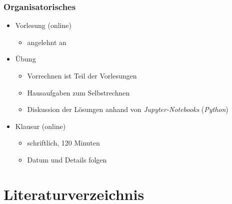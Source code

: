 \documentclass[hyperref={pdfpagemode=FullScreen, colorlinks=false}]{beamer}
\begin{document}
\begin{frame}
\frametitle{Organisatorisches}
    \begin{itemize}
        \item Vorlesung (online)
        \begin{itemize}
         \item angelehnt an \textsl{\cite{Verruijt2010, Vrettos2017, Schmidt2017}} %
        \end{itemize}
        
        \item Übung
                \begin{itemize} 
                \item Vorrechnen ist Teil der Vorlesungen
                \item Hausaufgaben zum Selbstrechnen
                \item Diskussion der Lösungen anhand von \textsl{Jupyter-Notebooks} (\textsl{Python})
        \end{itemize}

        \item Klausur (online)
        \begin{itemize}
         \item schriftlich, 120 Minuten
         \item Datum und Details folgen
        \end{itemize}
    \end{itemize}

\end{frame}

\section*{Literaturverzeichnis}

\begin{frame}[allowframebreaks]{}
	\printbibliography
\end{frame}
\end{document}
